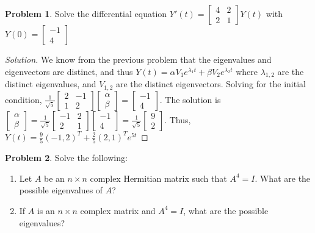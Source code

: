 \documentclass[oneside]{book}
\theoremstyle{definition}
\newtheorem{problem}{Problem}[section]
\begin{document}
\begin{problem}
Solve the differential equation $Y'(t) = \begin{bmatrix} 4 & 2 \\ 2 & 1 \end{bmatrix} Y(t)$ with $Y(0) = \begin{bmatrix} -1 \\ 4 \end{bmatrix}$
\end{problem}
\begin{proof}[Solution]
We know from the previous problem that the eigenvalues and eigenvectors are distinct, and thus $Y(t) = \alpha V_1 e^{\lambda_1 t} + \beta V_2 e^{\lambda_2 t}$ where $\lambda_{1,2}$ are the distinct eigenvalues, and $V_{1,2}$ are the distinct eigenvectors. Solving for the initial condition, $\frac{1}{\sqrt{5}}\begin{bmatrix} 2 & -1 \\ 1 & 2 \end{bmatrix}  \begin{bmatrix} \alpha \\ \beta \end{bmatrix} = \begin{bmatrix} -1 \\ 4 \end{bmatrix}$. The solution is $\begin{bmatrix} \alpha \\ \beta \end{bmatrix} = \frac{1}{\sqrt{5}}\begin{bmatrix} -1 & 2 \\ 2 & 1 \end{bmatrix} \begin{bmatrix} -1 \\ 4 \end{bmatrix} = \frac{1}{\sqrt{5}} \begin{bmatrix} 9 \\ 2 \end{bmatrix}$. Thus, \\ $Y(t) = \frac{9}{5}(-1,2)^T + \frac{2}{5} (2,1)^T e^{5t}$ 
\end{proof}

\begin{problem}
Solve the following:
\begin{enumerate}
\item Let $A$ be an $n\times n$ complex Hermitian matrix such that $A^4=I$. What are the possible eigenvalues of $A$?
\item If $A$ is an $n\times n$ complex matrix and $A^4 = I$, what are the possible eigenvalues?
\end{enumerate}
\end{problem}
\end{document}
